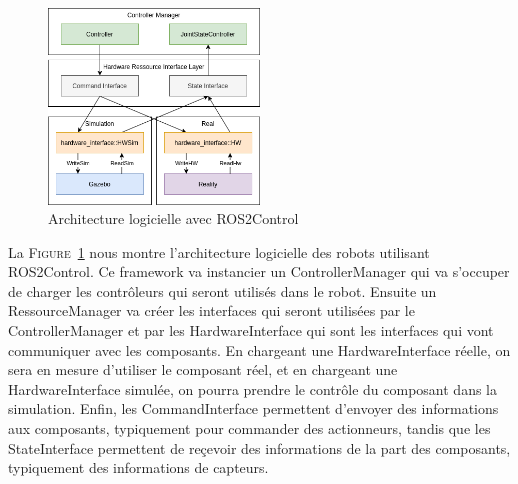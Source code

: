         \begin{figure}[!htb]
            \centering
            \includegraphics[width=0.5\textwidth]{imgs/ros2_control.png}
            \caption{Architecture logicielle avec \gls{ROS2Control}}
            \label{fig:ros2_control}
        \end{figure}

        La \textsc{Figure}~\ref{fig:ros2_control} nous montre l'architecture logicielle des robots utilisant \gls{ROS2Control}. Ce framework va instancier un ControllerManager qui va s'occuper de charger les contrôleurs qui seront utilisés dans le robot. Ensuite un RessourceManager va créer les interfaces qui seront utilisées par le ControllerManager et par les HardwareInterface qui sont les interfaces qui vont communiquer avec les composants. En chargeant une HardwareInterface réelle, on sera en mesure d'utiliser le composant réel, et en chargeant une HardwareInterface simulée, on pourra prendre le contrôle du composant dans la simulation. Enfin, les CommandInterface permettent d'envoyer des informations aux composants, typiquement pour commander des actionneurs, tandis que les StateInterface permettent de reçevoir des informations de la part des composants, typiquement des informations de capteurs.
        